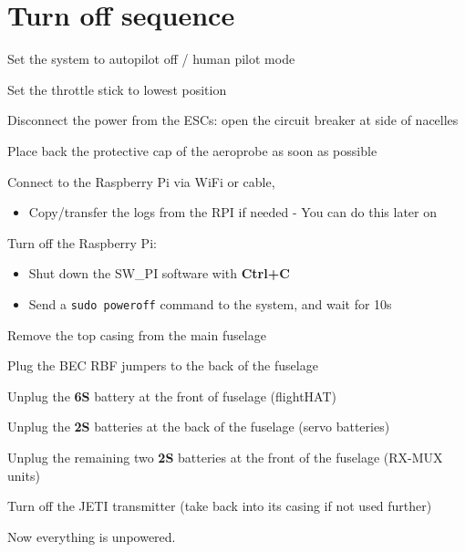 	\section{Turn off sequence}\label{iii.-turn-off-sequence}
	
	\begin{todolist}
	\itemsep1pt\parskip0pt
	\item
	  Set the system to autopilot off / human pilot mode
	\item
	  Set the throttle stick to lowest position
	\item
	  Disconnect the power from the ESCs: open the circuit breaker at side
	  of nacelles
	\item
	  Place back the protective cap of the aeroprobe as soon as possible
	\item
	  Connect to the Raspberry Pi via WiFi or cable,
	
	  \begin{itemize}
	  \itemsep1pt\parskip0pt
	  \item
	    Copy/transfer the logs from the RPI if needed - You can do this
	    later on
	  \end{itemize}
	\item
	  Turn off the Raspberry Pi:
	
	  \begin{itemize}
	  \itemsep1pt\parskip0pt
	  \item
	    Shut down the SW\_PI software with \textbf{Ctrl+C}
	  \item
	    Send a \texttt{sudo poweroff} command to the system, and wait for
	    10s
	  \end{itemize}
	\item
	  Remove the top casing from the main fuselage
	\item
	  Plug the BEC RBF jumpers to the back of the fuselage
	\item
	  Unplug the \textbf{6S} battery at the front of fuselage (flightHAT)
	\item
	  Unplug the \textbf{2S} batteries at the back of the fuselage (servo
	  batteries)
	\item
	  Unplug the remaining two \textbf{2S} batteries at the front of the
	  fuselage (RX-MUX units)
	\item
	  Turn off the JETI transmitter (take back into its casing if not used
	  further)
	\end{todolist}
	
	Now everything is unpowered.
	

